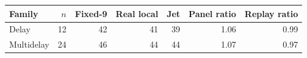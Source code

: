 \begin{tabular}{lrrrrrr}\toprule
Family & $n$ & Fixed-9 & Real local & Jet & Panel ratio & Replay ratio\\\midrule
Delay & 12 & 42 & 41 & 39 & 1.06 & 0.99\\
Multidelay & 24 & 46 & 44 & 44 & 1.07 & 0.97\\
\bottomrule\end{tabular}